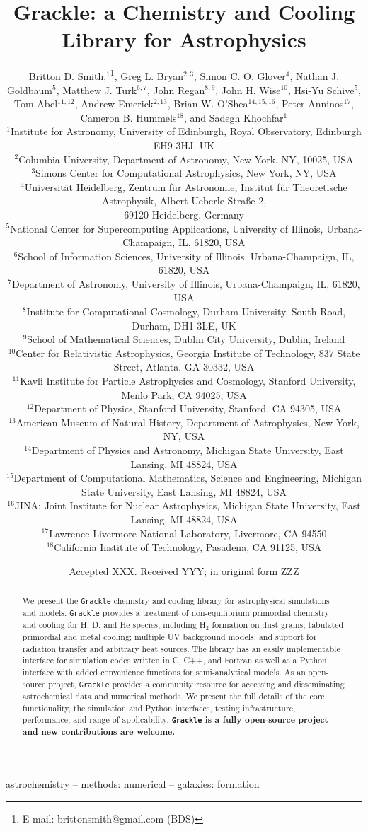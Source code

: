 \documentclass[a4paper,fleqn,usenatbib]{mnras}
\title[Grackle]{Grackle: a Chemistry and Cooling
  Library for Astrophysics}
\author[B.D. Smith et al.]
       {Britton D. Smith,$^{1}$\thanks{E-mail: brittonsmith@gmail.com
           (BDS)},
        Greg L. Bryan$^{2,3}$,
        Simon C. O. Glover$^{4}$,
        Nathan J. Goldbaum$^{5}$, \newauthor
        Matthew J. Turk$^{6,7}$,
        John Regan$^{8,9}$,
        John H. Wise$^{10}$,
        Hsi-Yu Schive$^{5}$,
        Tom Abel$^{11,12}$, \newauthor
        Andrew Emerick$^{2,13}$,
        Brian W. O'Shea$^{14,15,16}$,
        Peter Anninos$^{17}$, \newauthor
        Cameron B. Hummels$^{18}$,
        and Sadegh Khochfar$^{1}$\\
$^{1}$Institute for Astronomy, University of Edinburgh, Royal
Observatory, Edinburgh EH9 3HJ, UK\\
$^{2}$Columbia University, Department of Astronomy, New York, NY,
10025, USA\\
$^{3}$Simons Center for Computational Astrophysics, New York, NY,
USA\\
$^{4}$Universit\"{a}t Heidelberg, Zentrum f\"{u}r Astronomie, Institut
f\"{u}r Theoretische Astrophysik, Albert-Ueberle-Stra{\ss}e 2, \\69120
Heidelberg, Germany\\
$^{5}$National Center for Supercomputing Applications, University of
Illinois, Urbana-Champaign, IL, 61820, USA\\
$^{6}$School of Information Sciences, University of Illinois,
Urbana-Champaign, IL, 61820, USA\\
$^{7}$Department of Astronomy, University of Illinois,
Urbana-Champaign, IL, 61820, USA\\
$^{8}$Institute for Computational Cosmology, Durham University, South
Road, Durham, DH1 3LE, UK \\
$^{9}$School of Mathematical Sciences, Dublin City University, Dublin,
Ireland \\
$^{10}$Center for Relativistic Astrophysics, Georgia Institute of
Technology, 837 State Street, Atlanta, GA 30332, USA\\
$^{11}$Kavli Institute for Particle Astrophysics and Cosmology,
Stanford University, Menlo Park, CA 94025, USA\\
$^{12}$Department of Physics, Stanford University, Stanford, CA 94305,
USA\\
$^{13}$American Museum of Natural History, Department of Astrophysics,
New York, NY, USA\\
$^{14}$Department of Physics and Astronomy, Michigan State University,
East Lansing, MI 48824, USA\\
$^{15}$Department of Computational Mathematics, Science and
Engineering, Michigan State University, East Lansing, MI 48824, USA\\
$^{16}$JINA: Joint Institute for Nuclear Astrophysics, Michigan State
University, East Lansing, MI 48824, USA\\
$^{17}$Lawrence Livermore National Laboratory, Livermore, CA 94550\\
$^{18}$California Institute of Technology, Pasadena, CA 91125, USA\\
}
\date{Accepted XXX. Received YYY; in original form ZZZ}
\begin{document}
\label{firstpage}
\pagerange{\pageref{firstpage}--\pageref{lastpage}}
\maketitle

\begin{abstract}
We present the \texttt{Grackle} chemistry and cooling library for
astrophysical simulations and models.  \texttt{Grackle} provides
a treatment of non-equilibrium primordial chemistry and cooling for H, D, and He
species, including H$_{2}$ formation on dust grains; tabulated
primordial and metal cooling; multiple UV background models; and
support for radiation transfer and arbitrary heat sources.  The
library has an easily implementable interface for simulation codes
written in C, C++, and Fortran as well as a Python interface with
added convenience functions for semi-analytical models.  As an
open-source project, \texttt{Grackle} provides a community resource
for accessing and disseminating astrochemical data and numerical
methods.  We present the full details of the core functionality, the
simulation and Python interfaces, testing infrastructure, performance,
and range of applicability.  {\bf \texttt{Grackle} is a fully open-source
project and new contributions are welcome.}
\end{abstract}

\begin{keywords}
astrochemistry -- methods: numerical -- galaxies: formation
\end{keywords}

















\footnotesize{
  
  
}

\bsp
\label{lastpage}
\end{document}
